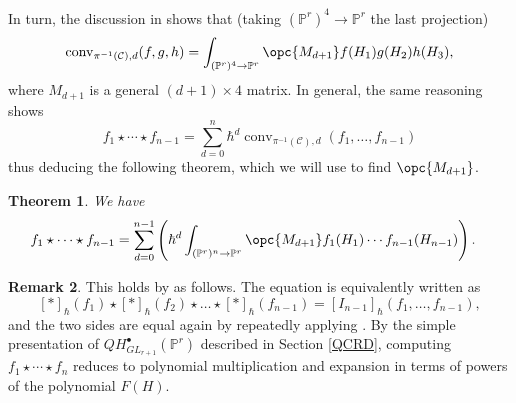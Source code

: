 \documentclass[12pt]{amsart}
\newcommand{\mb}{\mathbb}
\newcommand{\mc}{\mathcal}
\newcommand{\ol}{\overline}
\newcommand{\pt}{{\rm pt}}
\newcommand{\conv}{{\operatorname{conv}}}
\theoremstyle{plain}
\newtheorem{Thm}{Theorem}[section]
\theoremstyle{definition}
\newtheorem{Rem}[Thm]{Remark}
\theoremstyle{remark}
\begin{document}
In turn, the discussion in  shows that (taking $(\mb{P}^r)^4\to \mb{P}^r$ the last projection) \[\conv_{\pi^{-1}(\mathcal{C}), d}(f,g,h)=\int_{(\mb{P}^r)^4 \to \mb{P}^r}\opc{M_{d+1}} f(H_1) g(H_2) h(H_3),\] where $M_{d+1}$ is a general $(d+1) \times 4$ matrix. In general, the same reasoning shows $$f_1 \star \cdots \star f_{n-1}=\sum_{d=0}^n\hbar^d\conv_{\pi^{-1}(\mc{C}),d}(f_1,\ldots,f_{n-1})$$ thus deducing the following theorem, which we will use to find $\opc{M_{d+1}}$.

\begin{Thm}
\label{GOSP}
We have
\begin{align*}
f_1\star \cdots\star f_{n-1} &= \sum_{d=0}^{n-1} \left(\hbar^d\int_{(\mb{P}^r)^{n}\to \mb{P}^r}{\opc{M_{d+1}}f_1(H_1)\cdots f_{n-1}(H_{n-1})}\right).
\end{align*}
\end{Thm}

\begin{Rem}
This holds by  as follows. The equation is equivalently written as $$[\ast]_{\hbar}(f_1)\star [\ast]_{\hbar}(f_2) \star \ldots \star [\ast]_{\hbar}(f_{n-1})=[I_{n-1}]_{\hbar}(f_1,\ldots,f_{n-1}),$$ and the two sides are equal again by repeatedly applying . By the simple presentation of $QH^\bullet_{GL_{r+1}}(\mb{P}^r)$ described in Section \ref{QCRD}, computing $f_1\star \cdots\star f_n$ reduces to polynomial multiplication and expansion in terms of powers of the polynomial $F(H)$.
\end{Rem}
\end{document}
